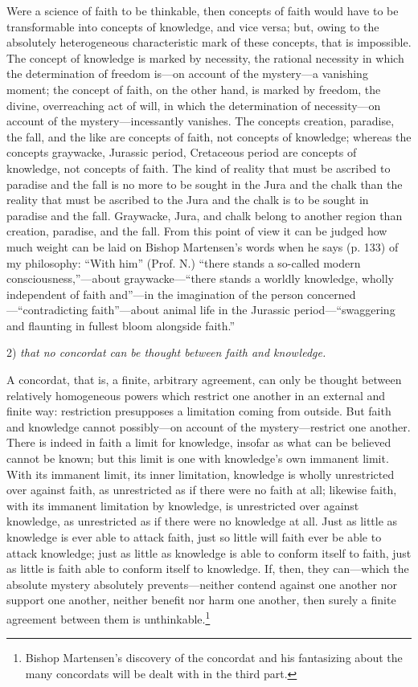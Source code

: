 \documentclass[12pt]{book}
\newcommand{\opage}[1]{\marginnote{\footnotesize\textit{[#1]}}}
\begin{document}
Were a science of faith to be thinkable, then concepts of faith would have to be transformable into concepts of knowledge, and vice versa; but, owing to the absolutely heterogeneous characteristic mark of these concepts, that is impossible. The concept of knowledge is marked by necessity, the rational necessity in which the determination of freedom is---on account of the mystery---a vanishing moment; the concept of faith, on the other hand, is marked by freedom, the divine, overreaching act of will, in which the determination of necessity---on account of the mystery---incessantly vanishes. The concepts creation, paradise, the fall, and the like are concepts of faith, not concepts of knowledge; whereas the concepts graywacke, Jurassic period, Cretaceous period are concepts of knowledge, not concepts of faith. The kind of reality that must be ascribed to paradise and the fall is no more to be sought in the Jura and the chalk than the reality that must be ascribed to the Jura and the chalk is to be sought in paradise and the fall. Graywacke, Jura, and chalk belong to another region than creation, paradise, and the fall. From this point of view it can be judged how much weight can be laid on Bishop Martensen's words when he says (p. 133) of my philosophy: ``With him'' (Prof. N.) ``there stands a so-called modern consciousness,''---about graywacke---``there stands a worldly knowledge, wholly independent of faith and''---in the imagination of the person concerned---``contradicting faith''---about animal life
\opage{35}\setcounter{footnote}{0}%
in the Jurassic period---``swaggering and flaunting in fullest bloom alongside faith.''

2) \emph{that no concordat can be thought between faith and knowledge.}

A concordat, that is, a finite, arbitrary agreement, can only be thought between relatively homogeneous powers which restrict one another in an external and finite way: restriction presupposes a limitation coming from outside. But faith and knowledge cannot possibly---on account of the mystery---restrict one another. There is indeed in faith a limit for knowledge, insofar as what can be believed cannot be known; but this limit is one with knowledge's own immanent limit. With its immanent limit, its inner limitation, knowledge is wholly unrestricted over against faith, as unrestricted as if there were no faith at all; likewise faith, with its immanent limitation by knowledge, is unrestricted over against knowledge, as unrestricted as if there were no knowledge at all. Just as little as knowledge is ever able to attack faith, just so little will faith ever be able to attack knowledge; just as little as knowledge is able to conform itself to faith, just as little is faith able to conform itself to knowledge. If, then, they can---which the absolute mystery absolutely prevents---neither contend against one another nor support one another, neither benefit nor harm one another, then surely a finite agreement between them is unthinkable.\footnote{Bishop Martensen's discovery of the concordat and his fantasizing about the many concordats will be dealt with in the third part.}
\end{document}
